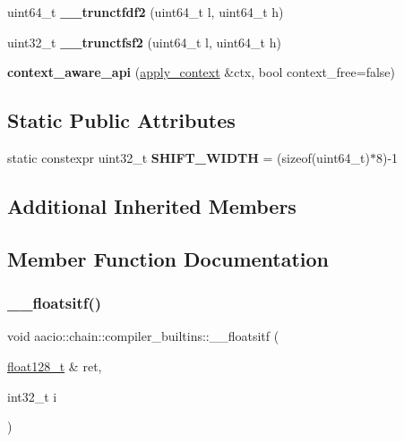 \begin{DoxyCompactItemize}
uint64\+\_\+t {\bfseries \+\_\+\+\_\+trunctfdf2} (uint64\+\_\+t l, uint64\+\_\+t h)
\item 
\mbox{\label{classaacio_1_1chain_1_1compiler__builtins_a3114e26743c1cc97fe4faabad0f813ec}} 
uint32\+\_\+t {\bfseries \+\_\+\+\_\+trunctfsf2} (uint64\+\_\+t l, uint64\+\_\+t h)
\item 
\mbox{\label{classaacio_1_1chain_1_1compiler__builtins_ad2711b0a72fe3f1b0b1512c97e16d285}} 
{\bfseries context\+\_\+aware\+\_\+api} (\mbox{\hyperlink{classaacio_1_1chain_1_1apply__context}{apply\+\_\+context}} \&ctx, bool context\+\_\+free=false)
\end{DoxyCompactItemize}
\subsection*{Static Public Attributes}
\begin{DoxyCompactItemize}
\item 
\mbox{\label{classaacio_1_1chain_1_1compiler__builtins_ad10bc8fe679883b5ca6981ad492f8096}} 
static constexpr uint32\+\_\+t {\bfseries S\+H\+I\+F\+T\+\_\+\+W\+I\+D\+TH} = (sizeof(uint64\+\_\+t)$\ast$8)-\/1
\end{DoxyCompactItemize}
\subsection*{Additional Inherited Members}


\subsection{Member Function Documentation}
\mbox{\label{classaacio_1_1chain_1_1compiler__builtins_a40d7ecbe753f60954f9c4e4042c2df66}} 
\subsubsection{\texorpdfstring{\+\_\+\+\_\+floatsitf()}{\_\_floatsitf()}}
{\footnotesize\ttfamily void aacio\+::chain\+::compiler\+\_\+builtins\+::\+\_\+\+\_\+floatsitf (\begin{DoxyParamCaption}\item[{\mbox{\hyperlink{structfloat128__t}{float128\+\_\+t}} \&}]{ret,  }\item[{int32\+\_\+t}]{i }\end{DoxyParamCaption})\hspace{0.3cm}{\ttfamily [inline]}}

